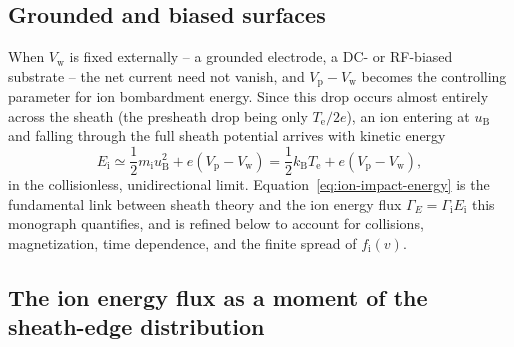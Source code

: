 \subsection{Grounded and biased surfaces}

When $V_{\mathrm{w}}$ is fixed externally -- a grounded electrode, a DC- or RF-biased substrate -- the net current need not vanish, and $V_{\mathrm{p}} - V_{\mathrm{w}}$ becomes the controlling parameter for ion bombardment energy. Since this drop occurs almost entirely across the sheath (the presheath drop being only $T_{\mathrm{e}}/2e$), an ion entering at $u_{\mathrm{B}}$ and falling through the full sheath potential arrives with kinetic energy
\begin{equation}
E_{\mathrm{i}} \simeq \frac{1}{2} m_{\mathrm{i}} u_{\mathrm{B}}^{2} + e\left(V_{\mathrm{p}} - V_{\mathrm{w}}\right) = \frac{1}{2} k_{\mathrm{B}} T_{\mathrm{e}} + e\left(V_{\mathrm{p}} - V_{\mathrm{w}}\right),
\label{eq:ion-impact-energy}
\end{equation}
in the collisionless, unidirectional limit. Equation~\eqref{eq:ion-impact-energy} is the fundamental link between sheath theory and the ion energy flux $\Gamma_{E} = \Gamma_{\mathrm{i}} E_{\mathrm{i}}$ this monograph quantifies, and is refined below to account for collisions, magnetization, time dependence, and the finite spread of $f_{\mathrm{i}}(v)$.

\subsection{The ion energy flux as a moment of the sheath-edge distribution}

